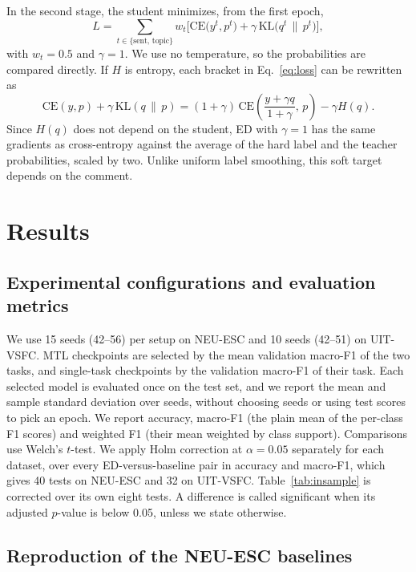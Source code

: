 \documentclass[pdflatex,sn-mathphys-num]{sn-jnl}%
\theoremstyle{thmstyleone}%
\theoremstyle{thmstyletwo}%
\theoremstyle{thmstylethree}%
\begin{document}
In the second stage, the student minimizes, from the first epoch,
\begin{equation}
L = \sum_{t\in\{\mathrm{sent},\,\mathrm{topic}\}} w_t \Big[ \mathrm{CE}\big(y^{t}, p^{t}\big) + \gamma\,\mathrm{KL}\big(q^{t} \,\|\, p^{t}\big) \Big], \label{eq:loss}
\end{equation}
with $w_t = 0.5$ and $\gamma = 1$. We use no temperature, so the probabilities are compared directly. If $H$ is entropy, each bracket in Eq.~\ref{eq:loss} can be rewritten as
\begin{equation}
\mathrm{CE}(y, p) + \gamma\,\mathrm{KL}(q \,\|\, p) = (1+\gamma)\,\mathrm{CE}\!\left(\frac{y+\gamma q}{1+\gamma},\, p\right) - \gamma H(q). \label{eq:mix}
\end{equation}
Since $H(q)$ does not depend on the student, ED with $\gamma = 1$ has the same gradients as cross-entropy against the average of the hard label and the teacher probabilities, scaled by two. Unlike uniform label smoothing, this soft target depends on the comment.

\section{Results}\label{sec:results}

\subsection{Experimental configurations and evaluation metrics}\label{subsec:config}

We use 15 seeds (42--56) per setup on NEU-ESC and 10 seeds (42--51) on UIT-VSFC. MTL checkpoints are selected by the mean validation macro-F1 of the two tasks, and single-task checkpoints by the validation macro-F1 of their task. Each selected model is evaluated once on the test set, and we report the mean and sample standard deviation over seeds, without choosing seeds or using test scores to pick an epoch. We report accuracy, macro-F1 (the plain mean of the per-class F1 scores) and weighted F1 (their mean weighted by class support). Comparisons use Welch's $t$-test. We apply Holm correction at $\alpha=0.05$ separately for each dataset, over every ED-versus-baseline pair in accuracy and macro-F1, which gives 40 tests on NEU-ESC and 32 on UIT-VSFC. Table~\ref{tab:insample} is corrected over its own eight tests. A difference is called significant when its adjusted $p$-value is below 0.05, unless we state otherwise.

\subsection{Reproduction of the NEU-ESC baselines}\label{subsec:repro}
\end{document}

